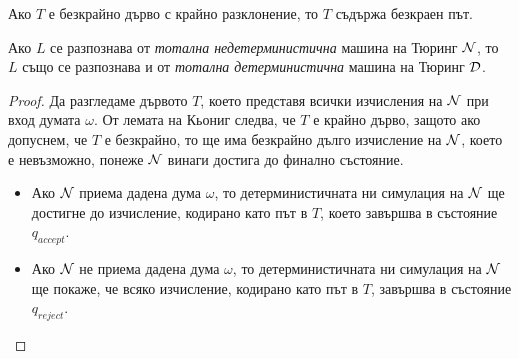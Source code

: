 \begin{prop}
  Ако $T$ е безкрайно дърво с крайно разклонение, то $T$ съдържа безкраен път.
\end{prop}

\begin{cor}
  Ако $L$ се разпознава от {\em тотална недетерминистична} машина на Тюринг $\mathcal{N}$, то $L$
  също се разпознава и от {\em тотална детерминистична} машина на Тюринг $\mathcal{D}$.
\end{cor}
\begin{proof}
  Да разгледаме дървото $T$, което представя всички изчисления на $\mathcal{N}$ при вход думата $\omega$.
  От лемата на Кьониг следва, че $T$ е крайно дърво, защото ако допуснем, че $T$ е безкрайно, то ще има безкрайно дълго изчисление на $\mathcal{N}$,
  което е невъзможно, понеже $\mathcal{N}$ винаги достига до финално състояние.
  \begin{itemize}
  \item 
    Ако $\mathcal{N}$ приема дадена дума $\omega$, то детерминистичната ни симулация на $\mathcal{N}$ ще достигне до изчисление, кодирано като път в $T$, 
    което завършва в състояние $q_{accept}$.
  \item
    Ако $\mathcal{N}$ не приема дадена дума $\omega$, то детерминистичната ни симулация на $\mathcal{N}$ ще покаже, че всяко изчисление, кодирано като път в $T$, завършва в състояние $q_{reject}$.
  \end{itemize}
\end{proof}





